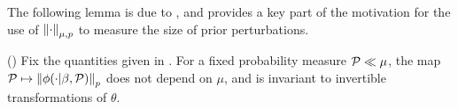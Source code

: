 The following lemma is due to \citep{gustafson:1996:local}, and provides
a key part of the motivation for the use of $\left\Vert\cdot\right\Vert_{\mu,p}$ to measure
the size of prior perturbations.

\begin{lem}
%
(\citet{gustafson:1996:local})
%
Fix the quantities given in .  For a fixed probability
measure $\mathcal{P} \ll \mu$, the map $\mathcal{P} \mapsto \left\Vert\phi(\cdot \vert \beta,
\mathcal{P})\right\Vert_p$ does not depend on $\mu$, and is invariant to invertible transformations
of $\theta$.
%
%
\end{lem}





